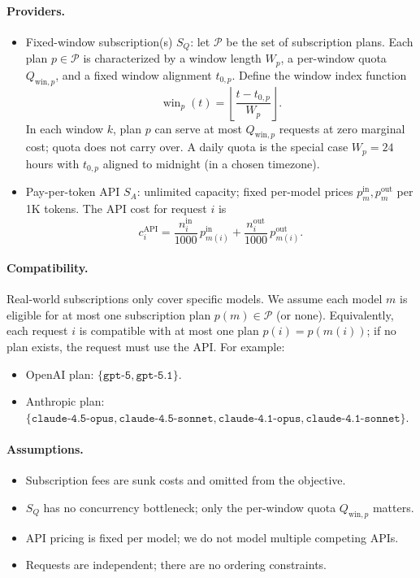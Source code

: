 \documentclass[11pt]{article}
\begin{document}
\paragraph{Providers.}
\begin{itemize}
  \item Fixed-window subscription(s) \(S_Q\): let \(\mathcal{P}\) be the set of subscription plans. Each plan \(p \in \mathcal{P}\) is characterized by a window length \(W_p\), a per-window quota \(Q_{\text{win},p}\), and a fixed window alignment \(t_{0,p}\). Define the window index function
  \[
    \operatorname{win}_p(t) = \left\lfloor \frac{t - t_{0,p}}{W_p} \right\rfloor.
  \]
  In each window \(k\), plan \(p\) can serve at most \(Q_{\text{win},p}\) requests at zero marginal cost; quota does not carry over. A daily quota is the special case \(W_p = 24\) hours with \(t_{0,p}\) aligned to midnight (in a chosen timezone).
  \item Pay-per-token API \(S_A\): unlimited capacity; fixed per-model prices \(p_m^{\text{in}}, p_m^{\text{out}}\) per 1K tokens. The API cost for request \(i\) is
  \[
    c_i^{\text{API}} = \frac{n_i^{\text{in}}}{1000}\,p_{m(i)}^{\text{in}} + \frac{n_i^{\text{out}}}{1000}\,p_{m(i)}^{\text{out}}.
  \]
\end{itemize}
\paragraph{Compatibility.}
Real-world subscriptions only cover specific models. We assume each model \(m\) is eligible for at most one subscription plan \(p(m) \in \mathcal{P}\) (or none). Equivalently, each request \(i\) is compatible with at most one plan \(p(i)=p(m(i))\); if no plan exists, the request must use the API.
For example:
\begin{itemize}
  \item OpenAI plan: \(\{ \texttt{gpt-5}, \texttt{gpt-5.1} \}\).
  \item Anthropic plan: \(\{ \texttt{claude-4.5-opus}, \texttt{claude-4.5-sonnet}, \texttt{claude-4.1-opus}, \texttt{claude-4.1-sonnet} \}\).
\end{itemize}
\paragraph{Assumptions.}
\begin{itemize}
  \item Subscription fees are sunk costs and omitted from the objective.
  \item \(S_Q\) has no concurrency bottleneck; only the per-window quota \(Q_{\text{win},p}\) matters.
  \item API pricing is fixed per model; we do not model multiple competing APIs.
  \item Requests are independent; there are no ordering constraints.
\end{itemize}
\end{document}
